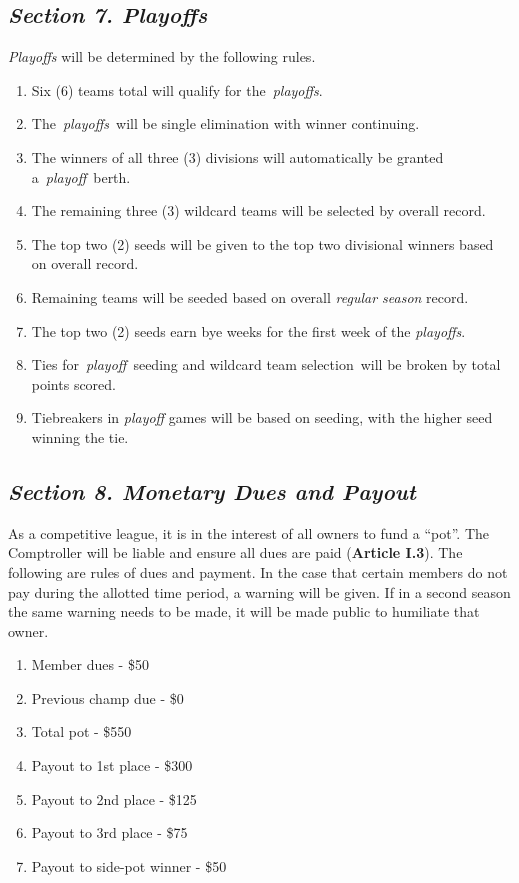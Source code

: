 \documentclass{article}
\begin{document}
    \subsection{\textit{Section 7. Playoffs}}
    \textit{Playoffs} will be determined by the following rules.
    \begin{enumerate}[label=\Alph*)]
        \item Six (6) teams total will qualify for the \textit{playoffs}.
        \item The \textit{playoffs} will be single elimination with winner continuing.
        \item The winners of all three (3) divisions will automatically be granted a \textit{playoff} berth.
        \item The remaining three (3) wildcard teams will be selected by overall record.
        \item The top two (2) seeds will be given to the top two divisional winners based on overall record.
        \item Remaining teams will be seeded based on overall \textit{regular season} record.
        \item The top two (2) seeds earn bye weeks for the first week of the \textit{playoffs}.
        \item Ties for \textit{playoff} seeding and wildcard team selection will be broken by total points scored.
        \item Tiebreakers in \textit{playoff} games will be based on seeding, with the higher seed winning the tie.
    \end{enumerate}
    \subsection{\textit{Section 8. Monetary Dues and Payout}}
    As a competitive league, it is in the interest of all owners to fund a “pot”. The Comptroller will be liable and ensure all dues are paid (\textbf{Article I.3}). The following are rules of dues and payment. In the case that certain members do not pay during the allotted time period, a warning will be given. If in a second season the same warning needs to be made, it will be made public to humiliate that owner.
    \begin{enumerate}[label=\Alph*)]
        \item Member dues - \$50
        \item Previous champ due - \$0
        \item Total pot - \$550
        \item Payout to 1st place - \$300
        \item Payout to 2nd place - \$125
        \item Payout to 3rd place - \$75
        \item Payout to side-pot winner - \$50
    \end{enumerate}
\end{document}

